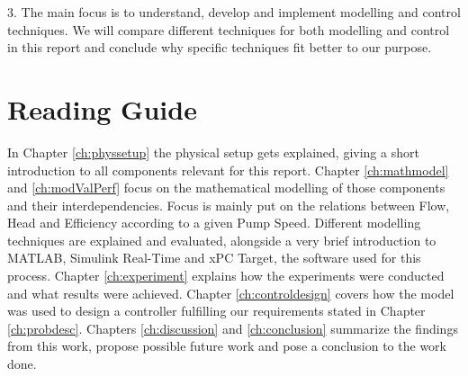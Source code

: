 3. The main focus is to understand, develop and implement modelling and control techniques.
We will compare different techniques for both modelling and control in this report
and conclude why specific techniques fit better to our purpose.
%
%
%
%
%
%
%
%
%
%
%
%

\section*{Reading Guide}
In Chapter \ref{ch:physsetup} the physical setup gets explained,
giving a short introduction to all components relevant for this report.
Chapter \ref{ch:mathmodel} and \ref{ch:modValPerf}
focus on the mathematical modelling of those components and their interdependencies.
Focus is mainly put on the relations between Flow, Head and Efficiency according to a given Pump Speed.
Different modelling techniques are explained and evaluated,
alongside a very brief introduction to MATLAB\textsuperscript{\textregistered{}},
Simulink\textsuperscript{\textregistered{}} Real-Time\texttrademark{} and xPC Target,
the software used for this process.
Chapter \ref{ch:experiment} explains how the experiments were conducted
and what results were achieved.
Chapter \ref{ch:controldesign} covers how the model was used to design a controller
fulfilling our requirements stated in Chapter \ref{ch:probdesc}.
Chapters \ref{ch:discussion} and \ref{ch:conclusion} summarize the findings from this work,
propose possible future work and pose a conclusion to the work done.
